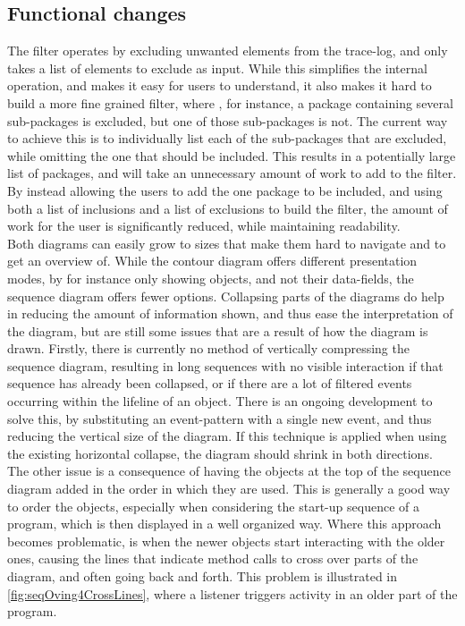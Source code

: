 \subsection{Functional changes}\label{jiveSuggestionsFunctional}
The filter operates by excluding unwanted elements from the trace-log, and only takes a list of elements to exclude as input.
While this simplifies the internal operation, and makes it easy for users to understand, it also makes it hard to build a more fine grained filter, where , for instance, a package containing several sub-packages is excluded, but one of those sub-packages is not.
The current way to achieve this is to individually list each of the sub-packages that are excluded, while omitting the one that should be included.
This results in a potentially large list of packages, and will take an unnecessary amount of work to add to the filter.
By instead allowing the users to add the one package to be included, and using both a list of inclusions and a list of exclusions to build the filter, the amount of work for the user is significantly reduced, while maintaining readability.
~\\%

Both diagrams can easily grow to sizes that make them hard to navigate and to get an overview of.
While the contour diagram offers different presentation modes, by for instance only showing objects, and not their data-fields, the sequence diagram offers fewer options.
Collapsing parts of the diagrams do help in reducing the amount of information shown, and thus ease the interpretation of the diagram, but are still some issues that are a result of how the diagram is drawn.
Firstly, there is currently no method of vertically compressing the sequence diagram, resulting in long sequences with no visible interaction if that sequence has already been collapsed, or if there are a lot of filtered events occurring within the lifeline of an object.
There is an ongoing development to solve this, by substituting an event-pattern with a single new event, and thus reducing the vertical size of the diagram.
If this technique is applied when using the existing horizontal collapse, the diagram should shrink in both directions.
~\\

The other issue is a consequence of having the objects at the top of the sequence diagram added in the order in which they are used.
This is generally a good way to order the objects, especially when considering the start-up sequence of a program, which is then displayed in a well organized way.
Where this approach becomes problematic, is when the newer objects start interacting with the older ones, causing the lines that indicate method calls to cross over parts of the diagram, and often going back and forth.
This problem is illustrated in \autoref{fig:seqOving4CrossLines}, where a listener triggers activity in an older part of the program.
~\\

